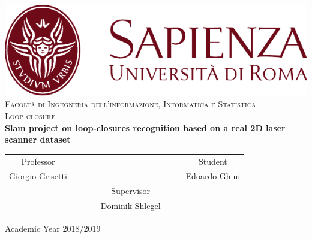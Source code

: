 \begin{titlepage}
\begin{center}
	\includegraphics[scale=0.8]{Images/SapienzaLogo} \\
	\vspace{3em}
	{\large \textsc{Facoltà di  Ingegneria dell'informazione, Informatica e Statistica}} \\
	\vspace{2em}
	{\large \textsc{ Loop closure}} \\
	\doublespacing
	\vspace{5em}
	{\Large \textbf{Slam project on loop-closures recognition based on a real 2D laser scanner dataset}}
\end{center}

\vskip 2cm
\begin{center}
\begin{tabular}{c c c c c c c c}
	Professor & & & & & & & Student \\[0.2cm]
	\large{Giorgio Grisetti} & & & & & & & \large{Edoardo Ghini}\\[0.4cm]
         & & & & Supervisor & & & \\[0.3cm]
         & & & & \large{Dominik Shlegel} & & & \\[0.4cm]
\end{tabular}
\end{center}

\vskip 1.5cm
\begin{center}
	{\normalsize Academic Year 2018/2019}
\end{center}
\end{titlepage}

\clearpage{\pagestyle{empty}\cleardoublepage}

\vspace{5em}

\onehalfspacing

\clearpage{\pagestyle{empty}\cleardoublepage}
